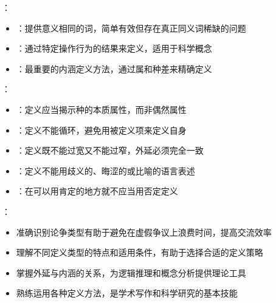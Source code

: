 {：
\begin{itemize}
  \item {}：提供意义相同的词，简单有效但存在真正同义词稀缺的问题
  \item {}：通过特定操作行为的结果来定义，适用于科学概念
  \item {}：最重要的内涵定义方法，通过属和种差来精确定义
\end{itemize}

：
\begin{itemize}
  \item {}：定义应当揭示种的本质属性，而非偶然属性
  \item {}：定义不能循环，避免用被定义项来定义自身
  \item {}：定义既不能过宽又不能过窄，外延必须完全一致
  \item {}：定义不能用歧义的、晦涩的或比喻的语言表述
  \item {}：在可以用肯定的地方就不应当用否定定义
\end{itemize}

：
\begin{itemize}
  \item 准确识别论争类型有助于避免在虚假争议上浪费时间，提高交流效率
  \item 理解不同定义类型的特点和适用条件，有助于选择合适的定义策略
  \item 掌握外延与内涵的关系，为逻辑推理和概念分析提供理论工具
  \item 熟练运用各种定义方法，是学术写作和科学研究的基本技能
\end{itemize}
}

